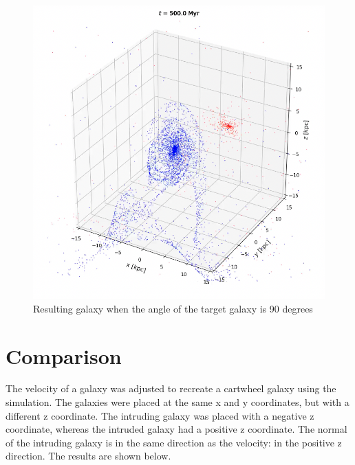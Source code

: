 \documentclass[linenumbers,RNAAS,trackchanges]{aastex631}
\begin{document}
\begin{figure}[H]
    \centering
    \includegraphics[scale=.50]{vip/90angle.png}
    \caption{Resulting galaxy when the angle of the target galaxy is 90 degrees}
    \label{fig:code}
\end{figure}

\section{Comparison} \label{sec:method}
The velocity of a galaxy was adjusted to recreate a cartwheel galaxy using the simulation. The galaxies were placed at the same x and y coordinates, but with a different z coordinate. The intruding galaxy was placed with a negative z coordinate, whereas the intruded galaxy had a positive z coordinate. The normal of the intruding galaxy is in the same direction as the velocity: in the positive z direction. The results are shown below.
\end{document}

